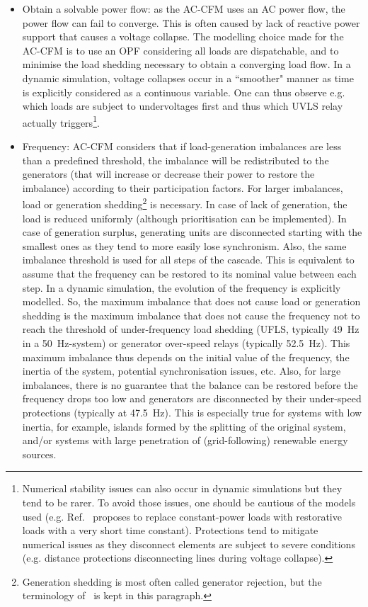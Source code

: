 \begin{itemize}
    \item Obtain a solvable power flow: as the AC-CFM uses an AC power flow, the power flow can fail to converge. This is often caused by lack of reactive power support that causes a voltage collapse. The modelling choice made for the AC-CFM is to use an OPF considering all loads are dispatchable, and to minimise the load shedding necessary to obtain a converging load flow. In a dynamic simulation, voltage collapses occur in a ``smoother" manner as time is explicitly considered as a continuous variable. One can thus observe e.g. which loads are subject to undervoltages first and thus which UVLS relay actually triggers\footnote{Numerical stability issues can also occur in dynamic simulations but they tend to be rarer. To avoid those issues, one should be cautious of the models used (e.g. Ref.~\cite[p93-98]{SongThesis} proposes to replace constant-power loads with restorative loads with a very short time constant). Protections tend to mitigate numerical issues as they disconnect elements are subject to severe conditions (e.g. distance protections disconnecting lines during voltage collapse).}.
    \item Frequency: AC-CFM considers that if load-generation imbalances are less than a predefined threshold, the imbalance will be redistributed to the generators (that will increase or decrease their power to restore the imbalance) according to their participation factors. For larger imbalances, load or generation shedding\footnote{Generation shedding is most often called generator rejection, but the terminology of~\cite{ManchesterNoebels} is kept in this paragraph.} is necessary. In case of lack of generation, the load is reduced uniformly (although prioritisation can be implemented). In case of generation surplus, generating units are disconnected starting with the smallest ones as they tend to more easily lose synchronism. Also, the same imbalance threshold is used for all steps of the cascade. This is equivalent to assume that the frequency can be restored to its nominal value between each step. In a dynamic simulation, the evolution of the frequency is explicitly modelled. So, the maximum imbalance that does not cause load or generation shedding is the maximum imbalance that does not cause the frequency not to reach the threshold of under-frequency load shedding (UFLS, typically 49~Hz in a 50~Hz-system) or generator over-speed relays (typically 52.5~Hz). This maximum imbalance thus depends on the initial value of the frequency, the inertia of the system, potential synchronisation issues, etc. Also, for large imbalances, there is no guarantee that the balance can be restored before the frequency drops too low and generators are disconnected by their under-speed protections (typically at 47.5~Hz). This is especially true for systems with low inertia, for example, islands formed by the splitting of the original system, and/or systems with large penetration of (grid-following) renewable energy sources.

\end{itemize}

